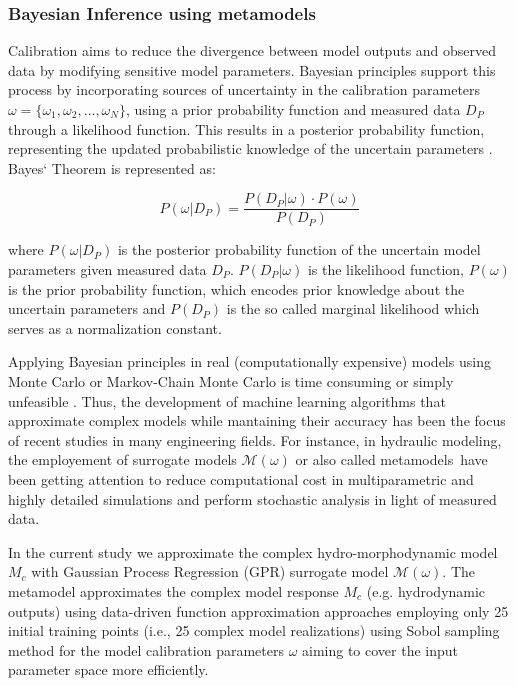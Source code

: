 \documentclass[draft,linenumbers,onecolumn]{agujournal2019} %
\begin{document}
\subsubsection{Bayesian Inference using metamodels}
\label{subsec:sec2.6.1}
Calibration aims to reduce the divergence between model outputs and observed data by modifying sensitive model parameters. Bayesian principles support this process by incorporating sources of uncertainty in the calibration parameters \( \omega = \{\omega_1, \omega_2, \ldots, \omega_N\} \), using a prior probability function and measured data  \(D_P\) through a likelihood function. This results in a posterior probability function, representing the updated probabilistic knowledge of the uncertain parameters \cite{smith1992bayesian,lim2017comprehensive}. Bayes` Theorem is represented as: 

\[
P(\omega | D_P) = \frac{P(D_P | \omega) \cdot P(\omega)}{P(D_P)}
\]

where \( P(\omega | D_P) \) is the posterior probability function of the uncertain model parameters given measured data \(D_P\). \(P(D_P | \omega)\)  is the likelihood function,  \( P(\omega) \) is the prior probability function, which encodes prior knowledge about the uncertain parameters and \( P(D_P) \) is the so called marginal likelihood which serves as a normalization constant.  


Applying Bayesian principles in real (computationally expensive) models using Monte Carlo or Markov-Chain Monte Carlo is time consuming or simply unfeasible \cite{smith1992bayesian,oladyshkin2020bayesian3}.
Thus, the development of machine learning algorithms that approximate complex models while mantaining their accuracy has been the focus of recent studies in many engineering fields. For instance, in hydraulic modeling, the employement of surrogate models \( \mathcal{M}(\omega) \)  or also called metamodels have been getting attention to reduce computational cost in  multiparametric and highly detailed simulations and perform stochastic analysis in light of measured data.


In the current study we approximate the complex hydro-morphodynamic model \( M_c \) with Gaussian Process Regression (GPR) surrogate model \( \mathcal{M}(\omega) \). The metamodel approximates the complex model response \( M_c \) (e.g. hydrodynamic outputs) using data-driven function approximation approaches \cite{razavi2012review} employing only 25 initial training points (i.e., 25 complex model realizations) using Sobol sampling method for the model calibration parameters \(\omega\) aiming to cover the input parameter space more efficiently. 
\end{document}
